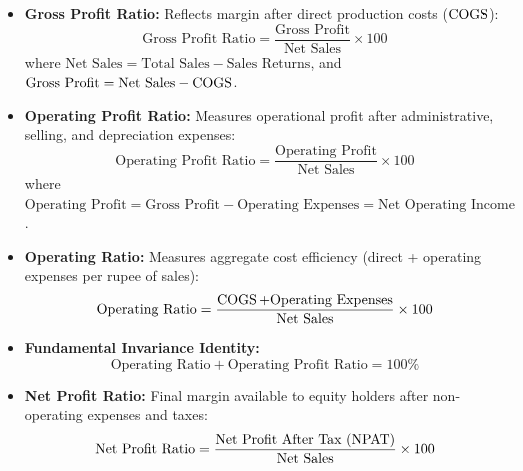 \begin{formulabox}
\begin{itemize}[leftmargin=*, noitemsep]
    \item \textbf{Gross Profit Ratio:} Reflects margin after direct production costs ($\operatorname{COGS}$):
    \begin{equation}
        \text{Gross Profit Ratio} = \frac{\text{Gross Profit}}{\text{Net Sales}} \times 100
    \end{equation}
    where $\text{Net Sales} = \text{Total Sales} - \text{Sales Returns}$, and $\text{Gross Profit} = \text{Net Sales} - \operatorname{COGS}$.

    \item \textbf{Operating Profit Ratio:} Measures operational profit after administrative, selling, and depreciation expenses:
    \begin{equation}
        \text{Operating Profit Ratio} = \frac{\text{Operating Profit}}{\text{Net Sales}} \times 100
    \end{equation}
    where $\text{Operating Profit} = \text{Gross Profit} - \text{Operating Expenses} = \text{Net Operating Income}$.

    \item \textbf{Operating Ratio:} Measures aggregate cost efficiency (direct + operating expenses per rupee of sales):
    \begin{equation}
        \text{Operating Ratio} = \frac{\operatorname{COGS} + \text{Operating Expenses}}{\text{Net Sales}} \times 100
    \end{equation}

    \item \textbf{Fundamental Invariance Identity:}
    \begin{equation}
        \text{Operating Ratio} + \text{Operating Profit Ratio} = 100\%
    \end{equation}

    \item \textbf{Net Profit Ratio:} Final margin available to equity holders after non-operating expenses and taxes:
    \begin{equation}
        \text{Net Profit Ratio} = \frac{\text{Net Profit After Tax } (\operatorname{NPAT})}{\text{Net Sales}} \times 100
    \end{equation}
\end{itemize}
\end{formulabox}

